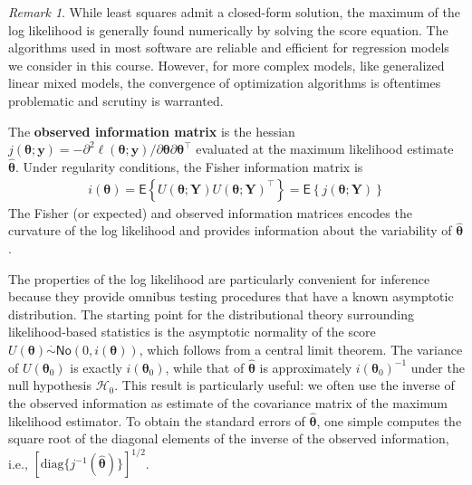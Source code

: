 \documentclass[
  11pt,
  letterpaper,
]{book}
\theoremstyle{definition}
\theoremstyle{definition}
\theoremstyle{definition}
\theoremstyle{definition}
\theoremstyle{remark}
\newtheorem*{remark}{Remark}
\begin{document}
\begin{remark}
{}While least squares admit a closed-form solution, the maximum of the log likelihood is generally found numerically by solving the score equation. The algorithms used in most software are reliable and efficient for regression models we consider in this course. However, for more complex models, like generalized linear mixed models, the convergence of optimization algorithms is oftentimes problematic and scrutiny is warranted.
\end{remark}

The \textbf{observed information matrix} is the hessian \(j(\boldsymbol{\theta}; \boldsymbol{y})=-\partial^2 \ell(\boldsymbol{\theta}; \boldsymbol{y})/\partial \boldsymbol{\theta} \partial \boldsymbol{\theta}^\top\) evaluated at the maximum likelihood estimate \(\widehat{\boldsymbol{\theta}}\).
Under regularity conditions, the Fisher information matrix is
\begin{align*}
i(\boldsymbol{\theta}) = \mathsf{E}\left\{U(\boldsymbol{\theta}; \boldsymbol{Y}) U(\boldsymbol{\theta}; \boldsymbol{Y})^\top\right\} = \mathsf{E}\left\{j(\boldsymbol{\theta}; \boldsymbol{Y})\right\}
\end{align*}
The Fisher (or expected) and observed information matrices encodes the curvature of the log likelihood and provides information about the variability of \(\widehat{\boldsymbol{\theta}}\).

The properties of the log likelihood are particularly convenient for inference because they provide omnibus testing procedures that have a known asymptotic distribution. The starting point for the distributional theory surrounding likelihood-based statistics is the asymptotic normality of the score \(U(\boldsymbol{\theta}) \stackrel{\cdot}{\sim}\mathsf{No}(0, i(\boldsymbol{\theta}))\), which follows from a central limit theorem. The variance of \(U(\boldsymbol{\theta}_0)\) is exactly \(i(\boldsymbol{\theta}_0)\), while that of \(\widehat{\boldsymbol{\theta}}\) is approximately \(i(\boldsymbol{\theta}_0)^{-1}\) under the null hypothesis \(\mathscr{H}_0\). This result is particularly useful: we often use the inverse of the observed information as estimate of the covariance matrix of the maximum likelihood estimator. To obtain the standard errors of \(\widehat{\boldsymbol{\theta}}\), one simple computes the square root of the diagonal elements of the inverse of the observed information, i.e., \([\mathrm{diag}\{j^{-1}(\widehat{\boldsymbol{\theta}})\}]^{1/2}\).
\end{document}
